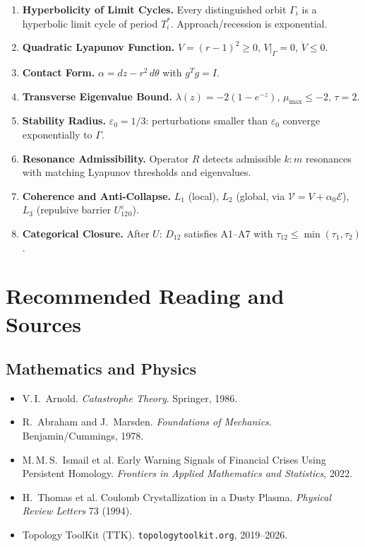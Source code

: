 \documentclass[11pt, twoside, openright]{book}
\theoremstyle{plain}
\theoremstyle{definition}
\newcommand{\eps}{\varepsilon_0}
\begin{document}
\begin{enumerate}[label=\textbf{A\arabic*.}, leftmargin=*, itemsep=6pt]

\item \textbf{Hyperbolicity of Limit Cycles.}
Every distinguished orbit $\Gamma_i$ is a hyperbolic limit cycle of
period $T_i^*$. Approach/recession is exponential.

\item \textbf{Quadratic Lyapunov Function.}
$V = (r-1)^2 \ge 0$, $V|_\Gamma = 0$, $\dot V \le 0$.

\item \textbf{Contact Form.}
$\alpha = dz - r^2\,d\theta$ with $g^T g = I$.

\item \textbf{Transverse Eigenvalue Bound.}
$\lambda(z) = -2(1-e^{-z})$, $\mu_{\max} \le -2$, $\tau = 2$.

\item \textbf{Stability Radius.}
$\eps = 1/3$: perturbations smaller than $\eps$ converge exponentially
to $\Gamma$.

\item \textbf{Resonance Admissibility.}
Operator $R$ detects admissible $k:m$ resonances with matching Lyapunov
thresholds and eigenvalues.

\item \textbf{Coherence and Anti-Collapse.}
$L_1$ (local), $L_2$ (global, via $\mathcal{V} = V + \alpha_0\mathcal{E}$),
$L_3$ (repulsive barrier $U_{12}^\eps$).

\item \textbf{Categorical Closure.}
After $U$: $D_{12}$ satisfies A1--A7 with $\tau_{12} \le \min(\tau_1,\tau_2)$.

\end{enumerate}

\chapter{Recommended Reading and Sources}

\section*{Mathematics and Physics}
\begin{itemize}[leftmargin=*]
  \item V.\,I.\ Arnold. \textit{Catastrophe Theory}. Springer, 1986.
  \item R.\ Abraham and J.\ Marsden. \textit{Foundations of Mechanics}.
    Benjamin/Cummings, 1978.
  \item M.\,M.\,S.\ Ismail et al. Early Warning Signals of Financial
    Crises Using Persistent Homology. \textit{Frontiers in Applied
    Mathematics and Statistics}, 2022.
  \item H.\ Thomas et al. Coulomb Crystallization in a Dusty Plasma.
    \textit{Physical Review Letters} 73 (1994).
  \item Topology ToolKit (TTK). \texttt{topologytoolkit.org}, 2019--2026.
\end{itemize}
\end{document}
